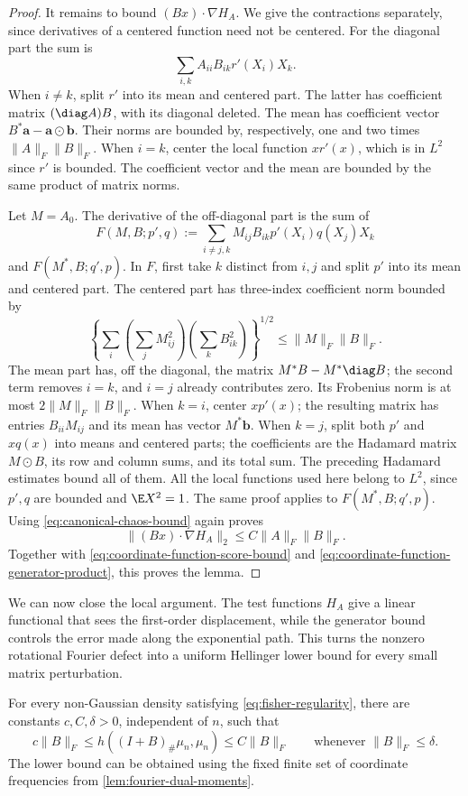 \begin{proof}
It remains to bound $(Bx)\cdot\nabla H_A$.  We give the
contractions separately, since derivatives of a centered
function need not be centered.  For the diagonal part the sum
is
\[
 \sum_{i,k}A_{ii}B_{ik}r'(X_i)X_k.
\]
When $i\ne k$, split $r'$ into its mean and centered part.
The latter has coefficient matrix
$(\diag A)B$, with its diagonal
deleted.  The mean has coefficient vector
$B^*\mathbf a-\mathbf a\mathbin{\odot}\mathbf b$.
Their norms are bounded by, respectively, one and two times
$\|A\|_F\|B\|_F$.  When $i=k$, center the local function
$xr'(x)$, which is in $L^2$ since $r'$ is bounded.  The
coefficient vector and the mean are bounded by the same
product of matrix norms.

Let $M=A_0$.  The derivative of the
off-diagonal part is the sum of
\[
 F(M,B;p',q):=
 \sum_{i\ne j,k}M_{ij}B_{ik}p'(X_i)q(X_j)X_k
\]
and $F(M^*,B;q',p)$.  In $F$, first take $k$ distinct
from $i,j$ and split $p'$ into its mean and centered part.
The centered part has three-index coefficient norm bounded by
\[
 \left\{\sum_i\left(\sum_jM_{ij}^2\right)
                    \left(\sum_kB_{ik}^2\right)\right\}^{1/2}
 \le\|M\|_F\|B\|_F.
\]
The mean part has, off the diagonal, the matrix
$M^*B-M^*\diag B$;
the second term removes $i=k$, and $i=j$ already contributes
zero.  Its Frobenius norm is at most $2\|M\|_F\|B\|_F$.
When $k=i$, center $xp'(x)$; the resulting matrix has entries
$B_{ii}M_{ij}$ and its mean has vector
$M^*\mathbf b$.  When $k=j$, split both
$p'$ and $xq(x)$ into means and centered parts; the coefficients
are the Hadamard matrix $M\mathbin{\odot}B$, its row and column
sums, and its total sum.  The preceding Hadamard estimates
bound all of them.  All the local functions used here belong
to $L^2$, since $p',q$ are bounded and $\E X^2=1$.
The same proof applies to $F(M^*,B;q',p)$.
Using \eqref{eq:canonical-chaos-bound} again proves
\[
 \|(Bx)\cdot\nabla H_A\|_2\le C\|A\|_F\|B\|_F.
\]
Together with \eqref{eq:coordinate-function-score-bound} and
\eqref{eq:coordinate-function-generator-product}, this proves the lemma.
\end{proof}

We can now close the local argument.
The test functions \(H_A\) give a linear functional that sees the
first-order displacement, while the generator bound controls the error made
along the exponential path.
This turns the nonzero rotational Fourier defect into a uniform Hellinger lower bound
for every small matrix perturbation.

\begin{proposition}
\label{prop:local-fisher-hellinger}
For every non-Gaussian density satisfying
\eqref{eq:fisher-regularity}, there are constants
$c,C,\delta>0$, independent of $n$, such that
\begin{equation}
 c\|B\|_F\le h((I+B)_\#\mu_n,\mu_n)
             \le C\|B\|_F
 \qquad\text{whenever }\|B\|_F\le\delta.
 \label{eq:local-matrix-hellinger}
\end{equation}
The lower bound can be obtained using the fixed finite set of
coordinate frequencies from \cref{lem:fourier-dual-moments}.
\end{proposition}

